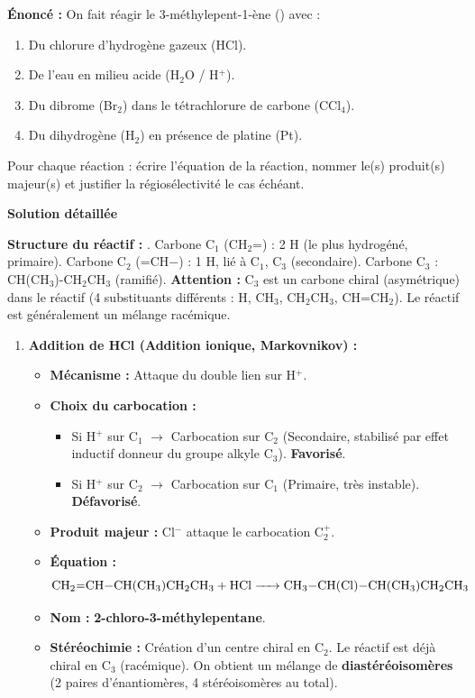 \documentclass[11pt]{article}
\begin{document}
\begin{exoresolu}
\textbf{Énoncé :} On fait réagir le 3-méthylepent-1-ène () avec :
\begin{enumerate}
    \item Du chlorure d'hydrogène gazeux (HCl).
    \item De l'eau en milieu acide (H$_2$O / H$^+$).
    \item Du dibrome (Br$_2$) dans le tétrachlorure de carbone (CCl$_4$).
    \item Du dihydrogène (H$_2$) en présence de platine (Pt).
\end{enumerate}
Pour chaque réaction : écrire l'équation de la réaction, nommer le(s) produit(s) majeur(s) et justifier la régiosélectivité le cas échéant.

\tcblower
\textbf{Solution détaillée}

\textbf{Structure du réactif :} . 
Carbone C$_1$ (CH$_2$=) : 2 H (le plus hydrogéné, primaire).
Carbone C$_2$ (=CH$-$) : 1 H, lié à C$_1$, C$_3$ (secondaire).
Carbone C$_3$ : CH(CH$_3$)-CH$_2$CH$_3$ (ramifié). \textbf{Attention :} C$_3$ est un carbone chiral (asymétrique) dans le réactif (4 substituants différents : H, CH$_3$, CH$_2$CH$_3$, CH=CH$_2$). Le réactif est généralement un mélange racémique.

\begin{enumerate}
    \item \textbf{Addition de HCl (Addition ionique, Markovnikov) :}
    \begin{itemize}
        \item \textbf{Mécanisme :} Attaque du double lien sur H$^+$. 
        \item \textbf{Choix du carbocation :} 
            \begin{itemize}
                \item Si H$^+$ sur C$_1$ $\rightarrow$ Carbocation sur C$_2$ (Secondaire, stabilisé par effet inductif donneur du groupe alkyle C$_3$). \textbf{Favorisé}.
                \item Si H$^+$ sur C$_2$ $\rightarrow$ Carbocation sur C$_1$ (Primaire, très instable). \textbf{Défavorisé}.
            \end{itemize}
        \item \textbf{Produit majeur :} Cl$^-$ attaque le carbocation C$_2^+$.
        \item \textbf{Équation :} 
        \[ \ce{CH2=CH-CH(CH3)CH2CH3 + HCl -> CH3-CH(Cl)-CH(CH3)CH2CH3} \]
        \item \textbf{Nom :} \textbf{2-chloro-3-méthylepentane}. 
        \item \textbf{Stéréochimie :} Création d'un centre chiral en C$_2$. Le réactif est déjà chiral en C$_3$ (racémique). On obtient un mélange de \textbf{diastéréoisomères} (2 paires d'énantiomères, 4 stéréoisomères au total).
    \end{itemize}


\end{enumerate}
\end{exoresolu}
\end{document}
